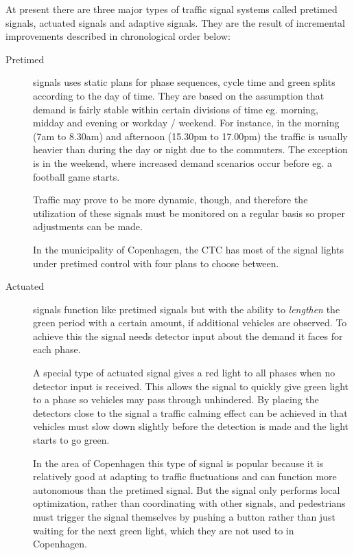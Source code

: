 \label{signal_types}

At present there are three major types of traffic signal systems called pretimed signals, actuated signals and adaptive signals. They are the result of incremental improvements described in chronological order below:

\begin{description}
\item[Pretimed] signals uses static plans for phase sequences, cycle time and green splits according to the day of time. 
\label{pretimed}
They are based on the assumption that demand is fairly stable within certain divisions of time eg. morning, midday and evening or workday / weekend. For instance, in the morning (7am to 8.30am) and afternoon (15.30pm to 17.00pm) the traffic is usually heavier than during the day or night due to the commuters. The exception is in the weekend, where increased demand scenarios occur before eg. a football game starts.

Traffic may prove to be more dynamic, though, and therefore the utilization of these signals must be monitored on a regular basis so proper adjustments can be made.

In the municipality of Copenhagen, the CTC has most of the signal lights under pretimed control with four plans to choose between.
\item[Actuated] signals function like pretimed signals but with the ability to \textit{lengthen} the green period with a certain amount, if additional vehicles are observed. 
\label{actuated}
To achieve this the signal needs detector input about the demand it faces for each phase.

A special type of actuated signal gives a red light to all phases when no detector input is received. This allows the signal to quickly give green light to a phase so vehicles may pass through unhindered. By placing the detectors close to the signal a traffic calming effect can be achieved in that vehicles must slow down slightly before the detection is made and the light starts to go green.

In the area of Copenhagen this type of signal is popular because it is relatively good at adapting to traffic fluctuations and can function more autonomous than the pretimed signal. But the signal only performs local optimization, rather than coordinating with other signals, and pedestrians must trigger the signal themselves by pushing a button rather than just waiting for the next green light, which they are not used to in Copenhagen.


\end{description}
